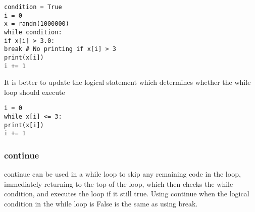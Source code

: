 \documentclass[Pydata.tex]{subfiles}
\begin{document}
\begin{framed}
\begin{verbatim}
condition = True
i = 0
x = randn(1000000)
while condition:
if x[i] > 3.0:
break # No printing if x[i] > 3
print(x[i])
i += 1
\end{verbatim}
\end{framed}

It is better to update the logical statement which determines whether the while loop should execute

\begin{framed}
\begin{verbatim}
i = 0
while x[i] <= 3:
print(x[i])
i += 1
\end{verbatim}
\end{framed}
\subsubsection{continue}
continue can be used in a while loop to skip any remaining code in the loop, immediately returning to the
top of the loop, which then checks the while condition, and executes the loop if it still true. Using continue
when the logical condition in the while loop is False is the same as using break.
\end{document}
